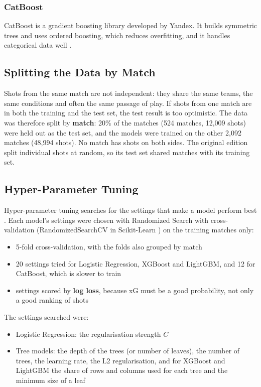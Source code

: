 \subsubsection{CatBoost}
CatBoost is a gradient boosting library developed by Yandex. It builds symmetric trees and uses ordered boosting, which reduces overfitting, and it handles categorical data well \cite{DBLP:journals/corr/DorogushGGKPV17}.

\subsection{Splitting the Data by Match}

Shots from the same match are not independent: they share the same teams, the same conditions and often the same passage of play. If shots from one match are in both the training and the test set, the test result is too optimistic. The data was therefore split by \textbf{match}: 20\% of the matches (524 matches, 12,009 shots) were held out as the test set, and the models were trained on the other 2,092 matches (48,994 shots). No match has shots on both sides. The original edition split individual shots at random, so its test set shared matches with its training set.

\subsection{Hyper-Parameter Tuning}

Hyper-parameter tuning searches for the settings that make a model perform best \cite{hyperparameter}. Each model's settings were chosen with Randomized Search with cross-validation (RandomizedSearchCV in Scikit-Learn \cite{scikit-learn}) on the training matches only:
\begin{itemize}
    \item 5-fold cross-validation, with the folds also grouped by match
    \item 20 settings tried for Logistic Regression, XGBoost and LightGBM, and 12 for CatBoost, which is slower to train
    \item settings scored by \textbf{log loss}, because xG must be a good probability, not only a good ranking of shots
\end{itemize}

The settings searched were:
\begin{itemize}
    \item Logistic Regression: the regularisation strength $C$
    \item Tree models: the depth of the trees (or number of leaves), the number of trees, the learning rate, the L2 regularisation, and for XGBoost and LightGBM the share of rows and columns used for each tree and the minimum size of a leaf
\end{itemize}

